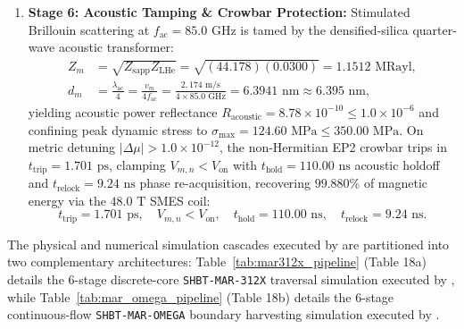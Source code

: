 \documentclass[11pt,onecolumn]{article}
\begin{document}
\begin{enumerate}
    \item \textbf{Stage 6: Acoustic Tamping \& Crowbar Protection:}
    Stimulated Brillouin scattering at $f_{\text{ac}} = 85.0\text{ GHz}$ is tamed by the densified-silica quarter-wave acoustic transformer:
    \begin{align}
        Z_m &= \sqrt{Z_{\text{sapp}} Z_{\text{LHe}}} = \sqrt{(44.178)(0.0300)} = 1.1512\text{ MRayl}, \nonumber \\
        d_m &= \frac{\lambda_{\text{ac}}}{4} = \frac{v_m}{4 f_{\text{ac}}} = \frac{2{,}174\text{ m/s}}{4 \times 85.0\text{ GHz}} = 6.3941\text{ nm} \approx 6.395\text{ nm},
        \label{eq:sim_acoustic_tamping}
    \end{align}
    yielding acoustic power reflectance $R_{\text{acoustic}} = 8.78 \times 10^{-10} \le 1.0 \times 10^{-6}$ and confining peak dynamic stress to $\sigma_{\text{max}} = 124.60\text{ MPa} \le 350.00\text{ MPa}$. On metric detuning $|\Delta\mu| > 1.0 \times 10^{-12}$, the non-Hermitian EP2 crowbar trips in $t_{\text{trip}} = 1.701\text{ ps}$, clamping $V_{m,n} < V_{\text{on}}$ with $t_{\text{hold}} = 110.00\text{ ns}$ acoustic holdoff and $t_{\text{relock}} = 9.24\text{ ns}$ phase re-acquisition, recovering $99.880\%$ of magnetic energy via the $48.0\text{ T}$ SMES coil:
    \begin{equation}
        t_{\text{trip}} = 1.701\text{ ps}, \quad V_{m,n} < V_{\text{on}}, \quad t_{\text{hold}} = 110.00\text{ ns}, \quad t_{\text{relock}} = 9.24\text{ ns}.
        \label{eq:sim_crowbar}
    \end{equation}
\end{enumerate}

The physical and numerical simulation cascades executed by  are partitioned into two complementary architectures: Table~\ref{tab:mar312x_pipeline} (Table 18a) details the 6-stage discrete-core \texttt{SHBT-MAR-312X} traversal simulation executed by , while Table~\ref{tab:mar_omega_pipeline} (Table 18b) details the 6-stage continuous-flow \texttt{SHBT-MAR-OMEGA} boundary harvesting simulation executed by .
\end{document}
